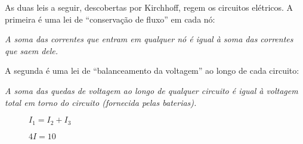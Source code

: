 \documentclass{beamer}
\begin{document}
    \begin{frame}
        As duas leis a seguir, descobertas por Kirchhoff, \pause regem os circuitos elétricos. \pause A primeira é uma lei de ``conservação de fluxo'' em cada nó:\pause

        \vspace{1.5cm}
        \begin{tcolorbox}[colback=green!30, colframe=green!80!blue, title=Lei da Corrente (nós)]
            \textit{A soma das correntes que entram em qualquer nó \pause é igual à soma das correntes que saem dele.}
        \end{tcolorbox}
    \end{frame}

    \begin{frame}
        A segunda é uma lei de ``balanceamento da voltagem'' ao longo de cada circuito:\pause

        \vspace{1.5cm}

        \begin{tcolorbox}[colback=green!30, colframe=green!80!blue, title=Lei da Voltagem (circuitos)]
            \textit{A soma das quedas de voltagem ao longo de qualquer circuito \pause é igual à voltagem total em torno do circuito (fornecida pelas baterias).}
        \end{tcolorbox}
    \end{frame}

    \begin{frame}
        \begin{figure}[!h]
            \centering
            
            \caption{$I_1 = I_2 + I_3$}
        \end{figure}
    \end{frame}

    \begin{frame}
        \begin{figure}[!h]
            \centering
            
            \caption{$4I = 10$}
        \end{figure}
    \end{frame}

    \begin{frame}
        \begin{figure}[!h]
            \centering
            
        \end{figure}
    \end{frame}
\end{document}
